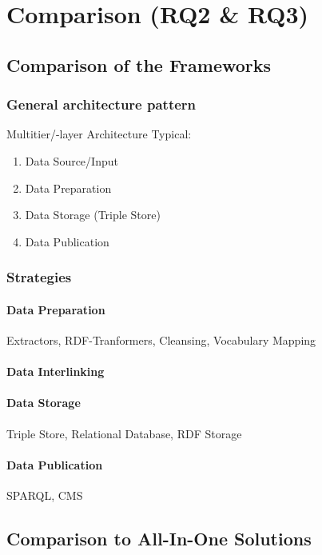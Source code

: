 \chapter{Comparison (RQ2 \& RQ3)}
\section{Comparison of the Frameworks}
\subsection{General architecture pattern}
Multitier/-layer Architecture
Typical:
\begin{enumerate}
\item Data Source/Input
\item Data Preparation
\item Data Storage (Triple Store)
\item Data Publication
\end{enumerate}
\subsection{Strategies}
\subsubsection{Data Preparation}
Extractors, RDF-Tranformers, Cleansing, Vocabulary Mapping
\subsubsection{Data Interlinking}
\subsubsection{Data Storage}
Triple Store, Relational Database, RDF Storage
\subsubsection{Data Publication}
SPARQL, CMS
\section{Comparison to All-In-One Solutions}